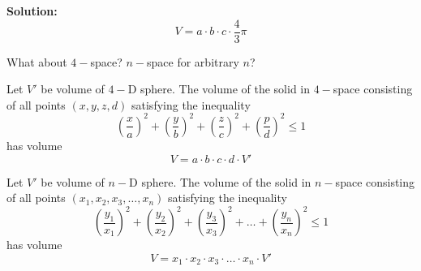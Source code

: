 \textbf{Solution:}
\[V = a \cdot b \cdot c \cdot \frac{4}{3} \pi\]

\begin{tcolorbox}[title=Problem 15, breakable]
    What about $4-$space? $n-$space for arbitrary $n$?
\end{tcolorbox}

Let $V'$ be volume of $4-$D sphere.
The volume of the solid 
    in $4-$space consisting of all points $(x, y, z, d)$ satisfying
    the inequality
\[\left(\frac{x}{a}\right)^2 + \left(\frac{y}{b}\right)^2 
+ \left(\frac{z}{c}\right)^2 + \left(\frac{p}{d}\right)^2 \le 1\]
has volume
\[V = a \cdot b \cdot c \cdot d \cdot V'\]

Let $V'$ be volume of $n-$D sphere.
The volume of the solid 
    in $n-$space consisting of all points $(x_1, x_2, x_3, \ldots, x_n)$ satisfying
    the inequality
\[\left(\frac{y_1}{x_1}\right)^2 + \left(\frac{y_2}{x_2}\right)^2 
+ \left(\frac{y_3}{x_3}\right)^2 + \ldots +  \left(\frac{y_n}{x_n}\right)^2 \le 1\]
has volume
\[V = x_1 \cdot x_2 \cdot x_3 \cdot \ldots \cdot x_n \cdot V'\]
